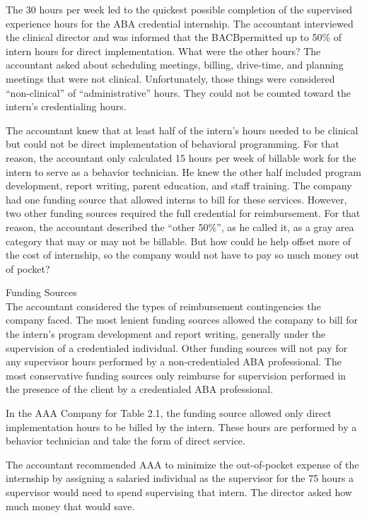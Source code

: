 The 30 hours per week led to the quickest possible completion of the supervised experience hours for the ABA credential internship. The accountant interviewed the clinical director and was informed that the BACB\textregistered permitted up to 50\% of intern hours for direct implementation. What were the other hours? The accountant asked about scheduling meetings, billing, drive-time, and planning meetings that were not clinical. Unfortunately, those things were considered ``non-clinical'' of ``administrative'' hours. They could not be counted toward the intern's credentialing hours.

The accountant knew that at least half of the intern's hours needed to be clinical but could not be direct implementation of behavioral programming. For that reason, the accountant only calculated 15 hours per week of billable work for the intern to serve as a behavior technician. He knew the other half included program development, report writing, parent education, and staff training. The company had one funding source that allowed interns to bill for these services. However, two other funding sources required the full credential for reimbursement. For that reason, the accountant described the ``other 50\%'', as he called it, as a gray area category that may or may not be billable. But how could he help offset more of the cost of internship, so the company would not have to pay so much money out of pocket?

Funding Sources\\
The accountant considered the types of reimbursement contingencies the company faced. The most lenient funding sources allowed the company to bill for the intern's program development and report writing, generally under the supervision of a credentialed individual. Other funding sources will not pay for any supervisor hours performed by a non-credentialed ABA professional. The most conservative funding sources only reimburse for supervision performed in the presence of the client by a credentialed ABA professional. 

In the AAA Company for Table 2.1, the funding source allowed only direct implementation hours to be billed by the intern. These hours are performed by a behavior technician and take the form of direct service.

The accountant recommended AAA to minimize the out-of-pocket expense of the internship by assigning a salaried individual as the supervisor for the 75 hours a supervisor would need to spend supervising that intern.  The director asked how much money that would save. 

